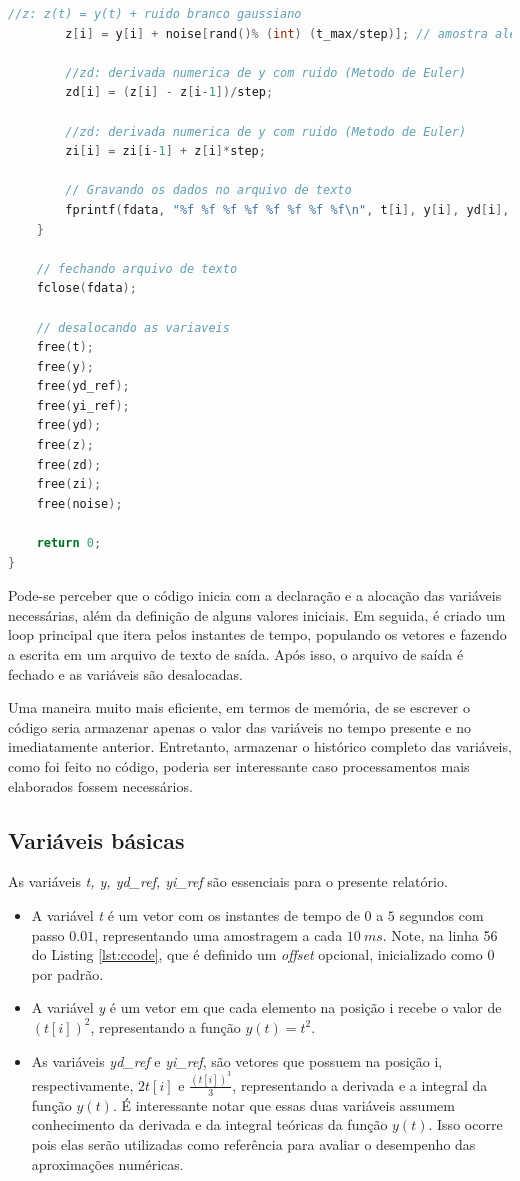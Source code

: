 \documentclass[
	12pt,				%
	openany,			%
	twoside,			%
	a4paper,			%
	english,			%
	french,				%
	spanish,			%
	brazil,				%
	]{abntex2}
\begin{document}
\begin{lstlisting}[language=C++,caption={Código em C para cálculo das derivadas e integrais},captionpos=t,label=lst:ccode]
        //z: z(t) = y(t) + ruido branco gaussiano
        z[i] = y[i] + noise[rand()% (int) (t_max/step)]; // amostra aleatoria da distr. normal
        
        //zd: derivada numerica de y com ruido (Metodo de Euler)
        zd[i] = (z[i] - z[i-1])/step;

        //zd: derivada numerica de y com ruido (Metodo de Euler)
        zi[i] = zi[i-1] + z[i]*step;

        // Gravando os dados no arquivo de texto
        fprintf(fdata, "%f %f %f %f %f %f %f %f\n", t[i], y[i], yd[i], yd_ref[i], yi_ref[i], z[i], zd[i], zi[i]);
    }

    // fechando arquivo de texto
    fclose(fdata);

    // desalocando as variaveis
    free(t);
    free(y);
    free(yd_ref);
    free(yi_ref);
    free(yd);
    free(z);
    free(zd);
    free(zi);
    free(noise);

    return 0;
}\end{lstlisting}
Pode-se perceber que o código inicia com a declaração e a alocação das variáveis necessárias, além da definição de alguns valores iniciais. Em seguida, é criado um loop principal que itera pelos instantes de tempo, populando os vetores e fazendo a escrita em um arquivo de texto de saída. Após isso, o arquivo de saída é fechado e as variáveis são desalocadas. 

Uma maneira muito mais eficiente, em termos de memória, de se escrever o código seria armazenar apenas o valor das variáveis no tempo presente e no imediatamente anterior. Entretanto, armazenar o histórico completo das variáveis, como foi feito no código, poderia ser interessante caso processamentos mais elaborados fossem necessários.

\subsection{Variáveis básicas}
As variáveis \emph{t, y, yd\_ref, yi\_ref} são essenciais para o presente relatório. 
\begin{itemize}
    \item A variável \emph{t} é um vetor com os instantes de tempo de $0$ a $5$ segundos com passo $0.01$, representando uma amostragem a cada $10\ ms$. Note, na linha 56 do Listing \ref{lst:ccode}, que é definido um \textit{offset} opcional, inicializado como 0 por padrão.
\item A variável \emph{y} é um vetor em que cada elemento na posição i recebe o valor de $(t[i])^2$, representando a função $y(t) = t^2$. 
\item As variáveis \emph{yd\_ref} e \emph{yi\_ref}, são vetores que possuem na posição i, respectivamente, $2t[i]$ e $\frac{(t[i])^3}{3}$, representando a derivada e a integral da função $y(t)$. É interessante notar que essas duas variáveis assumem conhecimento da derivada e da integral teóricas da função $y(t)$. Isso ocorre pois elas serão utilizadas como referência para avaliar o desempenho das aproximações numéricas.
\end{itemize}
\end{document}
